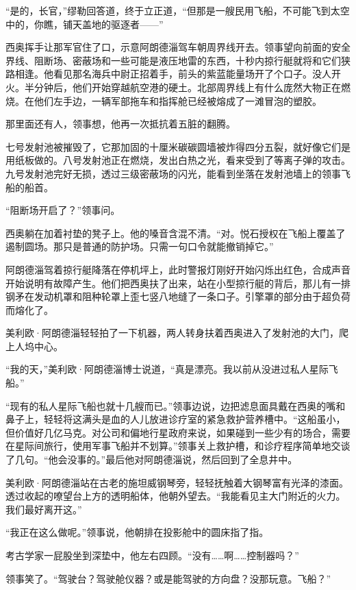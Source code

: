 \documentclass[AutoFakeBold=true]{book}
\begin{document}
``是的，长官，''缪勒回答道，终于立正道，``但那是一艘民用飞船，不可能飞到太空中的，你瞧，铺天盖地的驱逐者——''

西奥挥手让那军官住了口，示意阿朗德淄驾车朝周界线开去。领事望向前面的安全界线、阻断场、密蔽场和一些可能是液压地雷的东西，十秒内掠行艇就将和它们狭路相逢。他看见那名海兵中尉正招着手，前头的紫蓝能量场开了个口子。没人开火。半分钟后，他们开始穿越航空港的硬土。北部周界线上有什么庞然大物正在燃烧。在他们左手边，一辆军部拖车和指挥舱已经被熔成了一滩冒泡的塑胶。

那里面还有人，领事想，他再一次抵抗着五脏的翻腾。

七号发射池被摧毁了，它那加固的十厘米碳碳圆墙被炸得四分五裂，就好像它们是用纸板做的。八号发射池正在燃烧，发出白热之光，看来受到了等离子弹的攻击。九号发射池完好无损，透过三级密蔽场的闪光，能看到坐落在发射池墙上的领事飞船的船首。

``阻断场开启了？''领事问。

西奥躺在加着衬垫的凳子上。他的嗓音含混不清。``对。悦石授权在飞船上覆盖了遏制圆场。那只是普通的防护场。只需一句口令就能撤销掉它。''

阿朗德淄驾着掠行艇降落在停机坪上，此时警报灯刚好开始闪烁出红色，合成声音开始说明有故障产生。他们把西奥扶了出来，站在小型掠行艇的背后，那儿有一排钢矛在发动机罩和阻种轮罩上歪七竖八地缝了一条口子。引擎罩的部分由于超负荷而熔化了。

美利欧·阿朗德淄轻轻拍了一下机器，两人转身扶着西奥进入了发射池的大门，爬上人坞中心。

\vspace*{1em}

``我的天，''美利欧·阿朗德淄博士说道，``真是漂亮。我以前从没进过私人星际飞船。''

``现有的私人星际飞船也就十几艘而已。''领事边说，边把滤息面具戴在西奥的嘴和鼻子上，轻轻将这满头是血的人儿放进诊疗室的紧急救护营养槽中。``这船虽小，但价值好几亿马克。对公司和偏地行星政府来说，如果碰到一些少有的场合，需要在星际间旅行，使用军事飞船并不划算。''领事关上救护槽，和诊疗程序简单地交谈了几句。``他会没事的。''最后他对阿朗德淄说，然后回到了全息井中。

美利欧·阿朗德淄站在古老的施坦威钢琴旁，轻轻抚触着大钢琴富有光泽的漆面。透过收起的嘹望台上方的透明船体，他朝外望去。``我能看见主大门附近的火力。我们最好离开这。''

``我正在这么做呢。''领事说，他朝排在投影舱中的圆床指了指。

考古学家一屁股坐到深垫中，他左右四顾。``没有……啊……控制器吗？''

领事笑了。``驾驶台？驾驶舱仪器？或是能驾驶的方向盘？没那玩意。飞船？''
\end{document}
